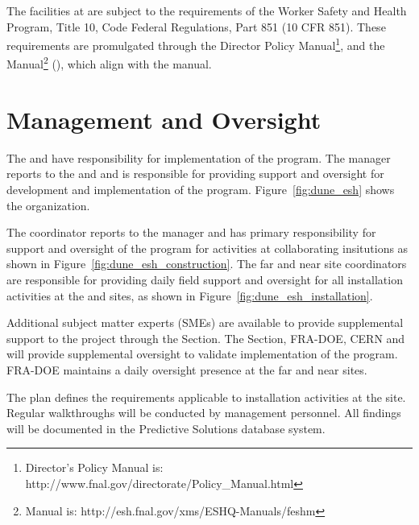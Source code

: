 The  facilities at  are subject to
the requirements of the  Worker Safety and Health Program,
Title 10, Code Federal Regulations, Part 851 (10 CFR 851). These
requirements are promulgated through the \fnal Director Policy
Manual\footnote{\fnal Director's Policy Manual is:
  http://www.fnal.gov/directorate/Policy\_Manual.html}, and the \fnal
{} Manual\footnote{\fnal {} Manual is:
  http://esh.fnal.gov/xms/ESHQ-Manuals/feshm} (), which
align with the   manual.


\section{  Management and Oversight}

The  and  have  responsibility for
implementation of the   program.  The
  manager reports to the
 and  and is responsible for providing
 support and oversight for development and implementation of the 
  program. Figure~\ref{fig:dune_esh} shows
the   organization.


The   coordinator reports to the
  manager and has primary responsibility
for  support and oversight of the  
program for activities at collaborating insitutions as shown in
Figure~\ref{fig:dune_esh_construction}.  The far and near site
 coordinators are responsible for providing daily field support and
oversight for all installation activities at the 
and  sites, as shown in Figure~\ref{fig:dune_esh_installation}.

Additional  subject matter experts (SMEs) are available to
provide supplemental support to the project through the \fnal
{} Section. The \fnal {} Section, FRA-DOE, CERN and
 will provide supplemental  oversight to
validate implementation of the  
program. FRA-DOE maintains a daily oversight presence at the far and
near sites.

The   plan defines the 
requirements applicable to installation activities at the 
site. Regular  walkthroughs will be conducted by
  management personnel. All
findings will be documented in the \fnal Predictive Solutions
database system.


